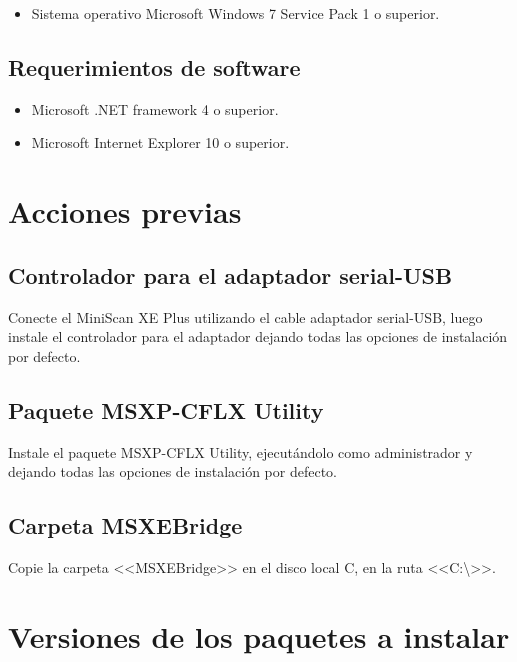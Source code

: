 	\begin{itemize}
		\item Sistema operativo Microsoft Windows 7 Service Pack 1 o superior.
	\end{itemize}
	
\subsection{Requerimientos de software}

	\begin{itemize}
		\item Microsoft .NET framework 4 o superior.
		
		\item Microsoft Internet Explorer 10 o superior.
	\end{itemize}

\newpage

\section{Acciones previas}

	\subsection{Controlador para el adaptador serial-USB}
	
	Conecte el MiniScan XE Plus utilizando el cable adaptador serial-USB, luego instale el controlador para el adaptador dejando todas las opciones de instalaci\'{o}n por defecto.

	\subsection{Paquete MSXP-CFLX Utility}
	
	Instale el paquete MSXP-CFLX Utility, ejecut\'{a}ndolo como administrador y dejando todas las opciones de instalaci\'{o}n por defecto.
	
	\subsection{Carpeta MSXEBridge}
	
	Copie la carpeta <<MSXEBridge>> en el disco local C, en la ruta <<C:\textbackslash>>.
	
\section{Versiones de los paquetes a instalar}

